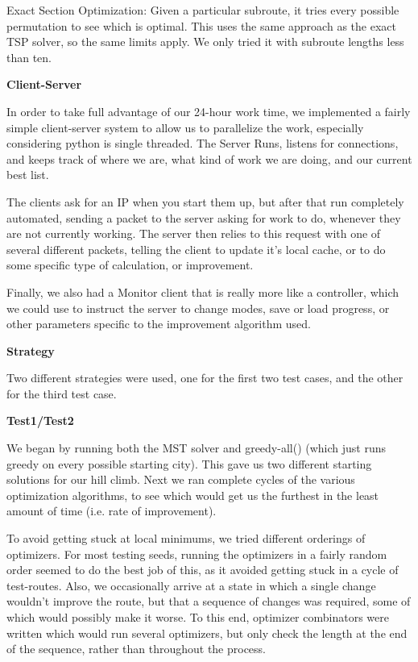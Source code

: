 \documentclass[letterpaper,10pt,titlepage,fleqn]{article}
\begin{document}
Exact Section Optimization: Given a particular subroute, it tries every possible permutation to see which is optimal. This uses the same approach as the exact TSP solver, so the same limits apply. We only tried it with subroute lengths less than ten. \\

\begin{Large}
\textbf{Client-Server}\\
\end{Large}

In order to take full advantage of our 24-hour work time, we implemented a fairly simple client-server system to allow us to parallelize the work, especially considering python is single threaded.  The Server Runs, listens for connections, and keeps track of where we are, what kind of work we are doing, and our current best list.  

The clients ask for an IP when you start them up, but after that run completely automated, sending a packet to the server asking for work to do, whenever they are not currently working.  The server then relies to this request with one of several different packets, telling the client to update it's local cache, or to do some specific type of calculation, or improvement.

Finally, we also had a Monitor client that is really more like a controller, which we could use to instruct the server to change modes, save or load progress, or other parameters specific to the improvement algorithm used.

\begin{Large}
\textbf{Strategy} \\
\end{Large}

Two different strategies were used, one for the first two test cases, and the other for the third test case.

\textbf{Test1/Test2}

We began by running both the MST solver and greedy-all() (which just runs greedy on every possible starting city). This gave us two different starting solutions for our hill climb. Next we ran complete cycles of the various optimization algorithms, to see which would get us the furthest in the least amount of time (i.e. rate of improvement). 

To avoid getting stuck at local minimums, we tried different orderings of optimizers. For most testing seeds, running the optimizers in a fairly random order seemed to do the best job of this, as it avoided getting stuck in a cycle of test-routes. Also, we occasionally arrive at a state in which a single change wouldn’t improve the route, but that a sequence of changes was required, some of which would possibly make it worse. To this end, optimizer combinators were written which would run several optimizers, but only check the length at the end of the sequence, rather than throughout the process.
\end{document}
